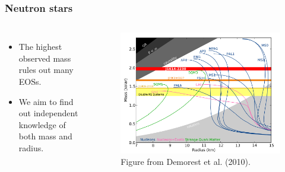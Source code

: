 \documentclass{beamer}
\begin{document}
\begin{frame}
\frametitle{Neutron stars}
\begin{columns}[c] %

\begin{itemize}
\item The highest observed mass rules out many EOSs.
\item We aim to find out independent knowledge of both mass and radius.
\end{itemize}


\begin{figure}
\includegraphics[width=1.1\linewidth]{eos_mr2.png}
\caption{Figure from Demorest et al. (2010).}
\end{figure}

\end{columns}
\end{frame}
\end{document}
